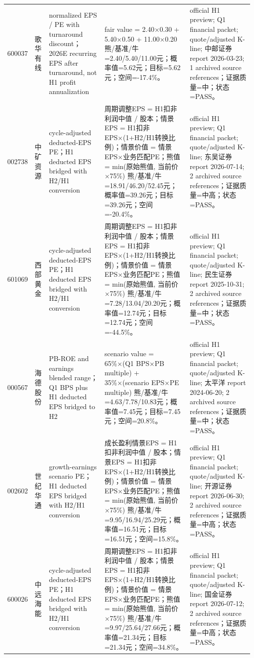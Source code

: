 \begin{longtable}{L{0.85cm}L{1.55cm}L{2.25cm}L{6.0cm}L{4.0cm}}
600037 & 歌华有线 & normalized EPS / PE with turnaround discount；2026E recurring EPS after turnaround, not H1 profit annualization & fair value = 2.40×0.30 + 5.40×0.50 + 11.00×0.20 熊/基准/牛=2.40/5.40/11.00元；概率值=5.62元；目标=5.62元；空间=-17.4\%。 & official H1 preview; Q1 financial packet; quote/adjusted K-line; 中邮证券 report 2026-03-23; 1 archived source references；证据质量=中；状态=PASS。 \\
002738 & 中矿资源 & cycle-adjusted deducted-EPS PE；H1 deducted EPS bridged with H2/H1 conversion & 周期调整EPS = H1扣非利润中值 / 股本；情景EPS = H1扣非EPS×(1+H2/H1转换比例)；情景价值 = 情景EPS×业务匹配PE；熊值 = min(原始熊值, 当前价×75\%) 熊/基准/牛=18.91/46.20/52.45元；概率值=39.26元；目标=39.26元；空间=-20.4\%。 & official H1 preview; Q1 financial packet; quote/adjusted K-line; 东吴证券 report 2026-07-14; 2 archived source references；证据质量=中高；状态=PASS。 \\
601069 & 西部黄金 & cycle-adjusted deducted-EPS PE；H1 deducted EPS bridged with H2/H1 conversion & 周期调整EPS = H1扣非利润中值 / 股本；情景EPS = H1扣非EPS×(1+H2/H1转换比例)；情景价值 = 情景EPS×业务匹配PE；熊值 = min(原始熊值, 当前价×75\%) 熊/基准/牛=7.28/13.04/20.20元；概率值=12.74元；目标=12.74元；空间=-44.5\%。 & official H1 preview; Q1 financial packet; quote/adjusted K-line; 民生证券 report 2025-10-31; 2 archived source references；证据质量=中；状态=PASS。 \\
000567 & 海德股份 & PB-ROE and earnings blended range；Q1 BPS plus H1 deducted EPS bridged to H2 & scenario value = 65\%×(Q1 BPS×PB multiple) + 35\%×(scenario EPS×PE multiple) 熊/基准/牛=4.63/7.78/10.83元；概率值=7.45元；目标=7.45元；空间=20.8\%。 & official H1 preview; Q1 financial packet; quote/adjusted K-line; 太平洋 report 2024-06-20; 2 archived source references；证据质量=中；状态=PASS。 \\
002602 & 世纪华通 & growth-earnings scenario PE；H1 deducted EPS bridged with H2/H1 conversion & 成长盈利情景EPS = H1扣非利润中值 / 股本；情景EPS = H1扣非EPS×(1+H2/H1转换比例)；情景价值 = 情景EPS×业务匹配PE；熊值 = min(原始熊值, 当前价×75\%) 熊/基准/牛=9.95/16.94/25.29元；概率值=16.51元；目标=16.51元；空间=15.8\%。 & official H1 preview; Q1 financial packet; quote/adjusted K-line; 开源证券 report 2026-06-30; 2 archived source references；证据质量=中高；状态=PASS。 \\
600026 & 中远海能 & cycle-adjusted deducted-EPS PE；H1 deducted EPS bridged with H2/H1 conversion & 周期调整EPS = H1扣非利润中值 / 股本；情景EPS = H1扣非EPS×(1+H2/H1转换比例)；情景价值 = 情景EPS×业务匹配PE；熊值 = min(原始熊值, 当前价×75\%) 熊/基准/牛=9.97/25.64/27.66元；概率值=21.34元；目标=21.34元；空间=34.8\%。 & official H1 preview; Q1 financial packet; quote/adjusted K-line; 国金证券 report 2026-07-12; 2 archived source references；证据质量=中高；状态=PASS。 \\

\end{longtable}
